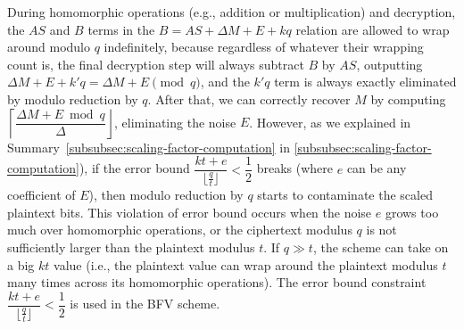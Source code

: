 $ $

 During homomorphic operations (e.g., addition or multiplication) and decryption, the $AS$ and $B$ terms in the $B = AS + \Delta M + E + kq$ relation are allowed to wrap around modulo $q$ indefinitely, because regardless of whatever their wrapping count is, the final decryption step will always subtract $B$ by $AS$, outputting $\Delta M + E + k'q = \Delta M + E \pmod q$, and the $k'q$ term is always exactly eliminated by modulo reduction by $q$. After that, we can correctly recover $M$ by computing $\left\lceil \dfrac{\Delta M + E \bmod q}{\Delta}\right\rfloor$, eliminating the noise $E$. However, as we explained in Summary~\ref*{subsubsec:scaling-factor-computation} in \autoref{subsubsec:scaling-factor-computation}), if the error bound $\dfrac{kt + e}{\lfloor\frac{q}{t}\rfloor} < \dfrac{1}{2}$ breaks (where $e$ can be any coefficient of $E$), then modulo reduction by $q$ starts to contaminate the scaled plaintext bits. This violation of error bound occurs when the noise $e$ grows too much over homomorphic operations, or the ciphertext modulus $q$ is not sufficiently larger than the plaintext modulus $t$. If $q \gg t$, the scheme can take on a big $kt$ value (i.e., the plaintext value can wrap around the plaintext modulus $t$ many times across its homomorphic operations). The error bound constraint  $\dfrac{kt + e}{\lfloor\frac{q}{t}\rfloor} < \dfrac{1}{2}$ is used in the BFV scheme.  %

 